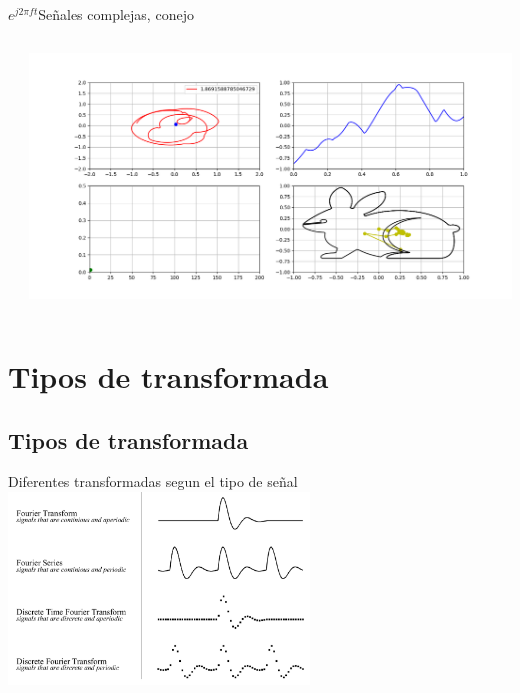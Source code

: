\begin{frame}{$e^{j2\pi ft}$}{Señales complejas, conejo}
   \handsonicon
   \begin{columns}[c]
      \hspace{2pt}
      \begin{column}{.5\textwidth}
         
      \end{column}
      \hspace{2pt}
      \vrule
      \hspace{2pt}
      \begin{column}{.4\textwidth}
         \centering\includegraphics[width=1.0\textwidth]{3_clase/euler6}
      \end{column}
      \hspace{2pt}
   \end{columns}
   \vfill
\end{frame}
 \section{Tipos de transformada}
 \subsection{Tipos de transformada}
 \begin{frame}{Diferentes transformadas segun el tipo de señal}{}
    \handsonicon
    \center\includegraphics[width=0.6\textwidth]{3_clase/fourier_types}
    \vfill
 \end{frame}
